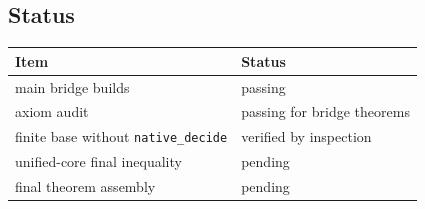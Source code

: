 \subsection{Status}

\begin{center}
\small
\begin{tabular}{@{}p{}p{}@{}}
\toprule
Item & Status \\
\midrule
main bridge builds & passing \\
axiom audit & passing for bridge theorems \\
finite base without \texttt{native\_decide} & verified by inspection \\
unified-core final inequality & pending \\
final theorem assembly & pending \\
\bottomrule
\end{tabular}
\end{center}
